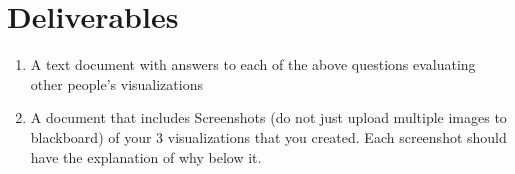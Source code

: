\documentclass[12pt]{article}
\begin{document}
    \section*{Deliverables}
    \begin{enumerate}
        \item A text document with answers to  each of the above questions evaluating other people's visualizations
        \item A document that includes Screenshots (do not just upload multiple images to blackboard) of your 3 visualizations that you created.  Each screenshot should have the explanation of why below it.
    \end{enumerate}
\end{document}
